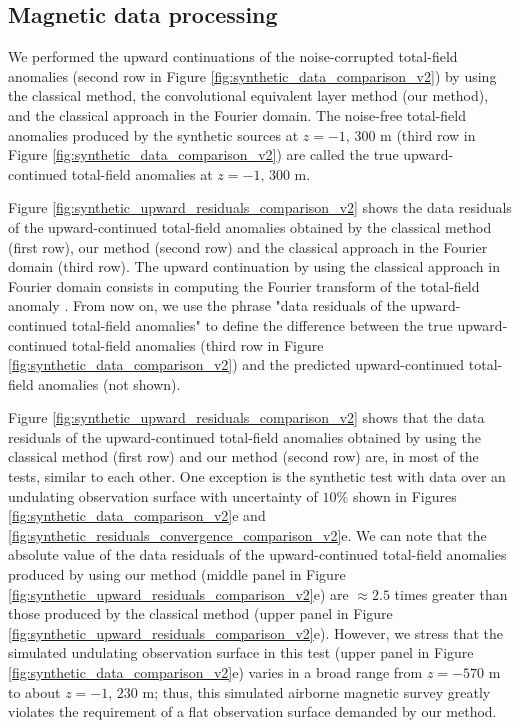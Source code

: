 \subsection*{Magnetic data processing}

We performed the upward continuations of the noise-corrupted total-field anomalies 
(second row in Figure \ref{fig:synthetic_data_comparison_v2}) by using 
the classical method, the convolutional equivalent layer method (our method), and 
the classical approach in the Fourier domain.
The noise-free total-field anomalies produced by the synthetic sources at $z = -1, \, 300$ m 
(third row in Figure \ref{fig:synthetic_data_comparison_v2}) are called the true upward-continued total-field anomalies at $z = -1, \, 300$ m.

Figure \ref{fig:synthetic_upward_residuals_comparison_v2} shows the data residuals of the upward-continued total-field anomalies obtained by the classical method (first row), our method (second row) and the classical approach in the Fourier domain (third row).
The upward continuation by using the classical approach in Fourier domain consists in  
computing the Fourier transform of the total-field anomaly \citep[][ p. 317]{blakely1996}. 
From now on, we use the phrase "data residuals of the upward-continued total-field anomalies" to define the difference between the true upward-continued total-field anomalies (third row in Figure \ref{fig:synthetic_data_comparison_v2}) and the predicted upward-continued total-field anomalies (not shown).


Figure \ref{fig:synthetic_upward_residuals_comparison_v2} shows that the data residuals of the upward-continued total-field anomalies obtained by using the classical method (first row) and our method (second row) are, in most of the tests, similar to each other. 
One exception is the synthetic test with data over an undulating observation surface with uncertainty 
of $10\%$ shown in Figures \ref{fig:synthetic_data_comparison_v2}e and 
\ref{fig:synthetic_residuals_convergence_comparison_v2}e.
We can note that the absolute value of the data residuals of the upward-continued total-field anomalies produced by using our method (middle panel in Figure \ref{fig:synthetic_upward_residuals_comparison_v2}e) 
are $\approx 2.5$ times greater than those produced by the classical method 
(upper panel in Figure \ref{fig:synthetic_upward_residuals_comparison_v2}e).
However, we stress that the simulated undulating observation surface in this test  
(upper panel in Figure \ref{fig:synthetic_data_comparison_v2}e) varies in a broad range from $z = - 570$ m to about $z = -1,\, 230$ m; thus, this simulated airborne magnetic survey greatly violates the requirement 
of a flat observation surface demanded by our method.

